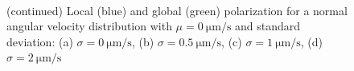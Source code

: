 \documentclass[../../master_thesis_np.tex]{subfiles}
\begin{document}
		\begin{figure}
		\centering
		\ContinuedFloat
			\\
			
			\caption{(continued) Local (blue) and global (green) polarization for a normal angular velocity distribution with $\mu = \SI{0}{\um\per\second}$ and standard deviation: (a) $\sigma = \SI{0}{\um\per\second}$, (b) $\sigma = \SI{0.5}{\um\per\second}$, (c) $\sigma = \SI{1}{\um\per\second}$, (d) $\sigma = \SI{2}{\um\per\second}$}
			\label{fig:lj_av_pol}
		\end{figure}
		
\end{document}
